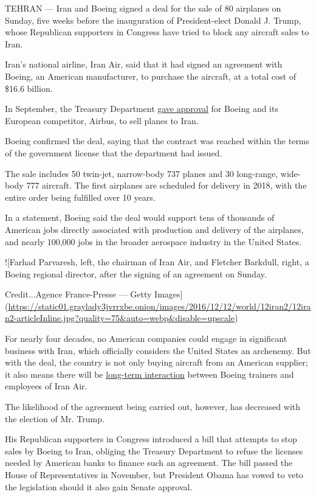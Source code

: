 TEHRAN --- Iran and Boeing signed a deal for the sale of 80 airplanes on
Sunday, five weeks before the inauguration of President-elect Donald J.
Trump, whose Republican supporters in Congress have tried to block any
aircraft sales to Iran.

Iran's national airline, Iran Air, said that it had signed an agreement
with Boeing, an American manufacturer, to purchase the aircraft, at a
total cost of \$16.6 billion.

In September, the Treasury Department
\href{https://www.nytimes3xbfgragh.onion/2016/09/22/world/middleeast/iran-airbus-boeing-aircraft.html?_r=0}{gave
approval} for Boeing and its European competitor, Airbus, to sell planes
to Iran.

Boeing confirmed the deal, saying that the contract was reached within
the terms of the government license that the department had issued.

The sale includes 50 twin-jet, narrow-body 737 planes and 30 long-range,
wide-body 777 aircraft. The first airplanes are scheduled for delivery
in 2018, with the entire order being fulfilled over 10 years.

In a statement, Boeing said the deal would support tens of thousands of
American jobs directly associated with production and delivery of the
airplanes, and nearly 100,000 jobs in the broader aerospace industry in
the United States.

!{[}Farhad Parvaresh, left, the chairman of Iran Air, and Fletcher
Barkdull, right, a Boeing regional director, after the signing of an
agreement on Sunday.

Credit...Agence France-Presse --- Getty
Images{]}(\url{https://static01.graylady3jvrrxbe.onion/images/2016/12/12/world/12iran2/12iran2-articleInline.jpg?quality=75\&auto=webp\&disable=upscale})

For nearly four decades, no American companies could engage in
significant business with Iran, which officially considers the United
States an archenemy. But with the deal, the country is not only buying
aircraft from an American supplier; it also means there will be
\href{http://www.nytimes3xbfgragh.onion/2016/09/23/world/middleeast/with-boeing-deal-americans-are-coming-to-iran.html?_r=0}{long-term
interaction} between Boeing trainers and employees of Iran Air.

The likelihood of the agreement being carried out, however, has
decreased with the election of Mr. Trump.

His Republican supporters in Congress introduced a bill that attempts to
stop sales by Boeing to Iran, obliging the Treasury Department to refuse
the licenses needed by American banks to finance such an agreement. The
bill passed the House of Representatives in November, but President
Obama has vowed to veto the legislation should it also gain Senate
approval.

